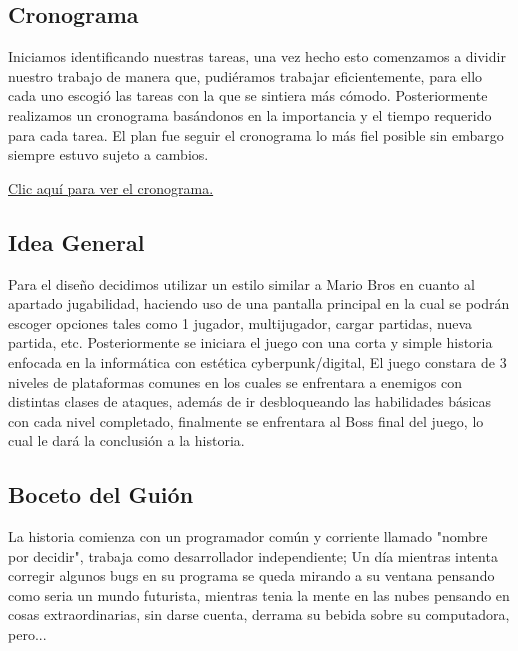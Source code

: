 \documentclass{article}
\begin{document}
    \subsection{Cronograma}
        Iniciamos identificando nuestras tareas, una vez hecho esto comenzamos a dividir nuestro trabajo de manera que, pudiéramos trabajar eficientemente, para ello cada uno escogió las tareas con la que se sintiera más cómodo. Posteriormente realizamos un cronograma basándonos en la importancia y el tiempo requerido para cada tarea. El plan fue seguir el cronograma lo más fiel posible sin embargo siempre estuvo sujeto a cambios. 
        
        \vspace{0.3cm}
        
        \begin{flushleft}
        \href{https://spangle-prune-66e.notion.site/10b2778c1ce2479b88289a3ae453be1d?v=0732ac7241e9473ebe7c90af682b0ed8}{Clic aquí para ver el cronograma.}
        \end{flushleft}
        
        \subsection{Idea General}
        Para el diseño decidimos utilizar un estilo similar a Mario Bros en cuanto al apartado jugabilidad, haciendo uso de una pantalla principal en la cual se podrán escoger opciones tales como 1 jugador, multijugador, cargar partidas, nueva partida, etc. Posteriormente se iniciara el juego con una corta y simple historia enfocada en la informática con estética cyberpunk/digital, El juego constara de 3 niveles de plataformas comunes en los cuales se enfrentara a enemigos con distintas clases de ataques, además de ir desbloqueando las habilidades básicas con cada nivel completado, finalmente se enfrentara al Boss final del juego, lo cual le dará la conclusión a la historia.
        
    \newpage
        
        \subsection{Boceto del Guión}
        La historia comienza con un programador común y corriente llamado "nombre por decidir", trabaja como desarrollador independiente; Un día mientras intenta corregir algunos bugs en su programa se queda mirando a su ventana pensando como seria un mundo futurista, mientras tenia la mente en las nubes pensando en cosas extraordinarias, sin darse cuenta, derrama su bebida sobre su computadora, pero...
        
\end{document}
